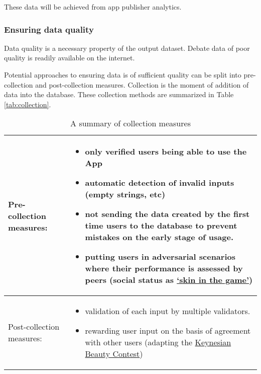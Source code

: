 \documentclass{article}
\begin{document}
These data will be achieved from app publisher analytics.

\subsubsection{Ensuring data quality}
Data quality is a necessary property of the output dataset. Debate data of poor quality is readily available on the internet.

Potential approaches to ensuring data is of sufficient quality can be split into pre-collection and post-collection measures. Collection is the moment of addition of data into the database. These collection methods are summarized in Table \ref{tab:collection}.

  \begin{table}[h!]
      \centering
    \begin{tabular}{|l|p{8cm}|}
\toprule
Pre-collection measures:  & \begin{itemize}[left=0pt,topsep=0pt]\item only verified users being able to use the App
  \item automatic detection of invalid inputs (empty strings, etc)
  \item not sending the data created by the first time users to the database to prevent mistakes on the early stage of usage.
  \item putting users in adversarial scenarios where their performance is assessed by peers (social status as \href{https://dictionary.cambridge.org/dictionary/english/have-skin-in-the-game}{`skin in the game'})
\end{itemize} \\
\midrule
       Post-collection measures:  & \begin{itemize}[left=0pt,topsep=0pt]
  \item validation of each input by multiple validators.  
  \item rewarding user input on the basis of agreement with other users (adapting the \href{https://en.wikipedia.org/wiki/Keynesian_beauty_contest}{Keynesian Beauty Contest}\cite{Keynes1936})
\end{itemize} \\
\bottomrule
    \end{tabular}
    \caption{A summary of collection measures}

 \end{table}\label{tab:collection}

\newpage
\end{document}
